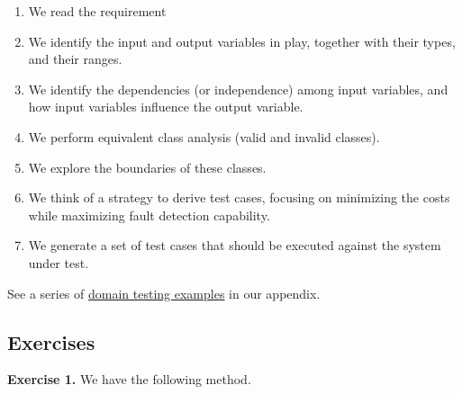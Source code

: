 \begin{enumerate}
\def\labelenumi{\arabic{enumi}.}
\tightlist
\item
  We read the requirement
\item
  We identify the input and output variables in play, together with
  their types, and their ranges.
\item
  We identify the dependencies (or independence) among input variables,
  and how input variables influence the output variable.
\item
  We perform equivalent class analysis (valid and invalid classes).
\item
  We explore the boundaries of these classes.
\item
  We think of a strategy to derive test cases, focusing on minimizing
  the costs while maximizing fault detection capability.
\item
  We generate a set of test cases that should be executed against the
  system under test.
\end{enumerate}

See a series of
\href{/chapters/testing-techniques/domain-testing.html}{domain testing
examples} in our appendix.

\hypertarget{exercises}{%
\subsection{Exercises}\label{exercises}}

\textbf{Exercise 1.} We have the following method.

\begin{Shaded}
\begin{Highlighting}[]
  \NormalTok{(}
  \NormalTok{();}
  \NormalTok{;}

  \NormalTok{;}
  \NormalTok{;}

  \NormalTok{;}
  \NormalTok{(}

\NormalTok{();}
\NormalTok{  \}}

  \NormalTok{(}
\NormalTok{\}}
\end{Highlighting}
\end{Shaded}

